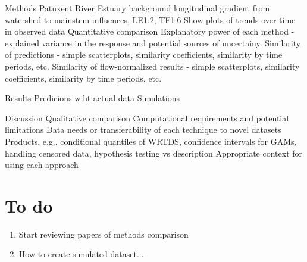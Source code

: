 \documentclass[letterpaper,12pt]{article}\usepackage[]{graphicx}\usepackage[]{color}
\begin{document}
\begin{outline}
\0 Methods
\1 Patuxent River Estuary background
\2 longitudinal gradient from watershed to mainstem influences, LE1.2, TF1.6
\2 Show plots of trends over time in observed data
\1 Quantitative comparison
\2 Explanatory power of each method - explained variance in the response and potential sources of uncertainy.
\2 Similarity of predictions - simple scatterplots, similarity coefficients, similarity by time periods, etc.
\2 Similarity of flow-normalized results - simple scatterplots, similarity coefficients, similarity by time periods, etc.

\0 Results
\1 Predicions wiht actual data
\1 Simulations

\0 Discussion
\1 Qualitative comparison
\2 Computational requirements and potential limitations
\2 Data needs or transferability of each technique to novel datasets
\2 Products, e.g., conditional quantiles of \ac{WRTDS}, confidence intervals for \acp{GAM}, handling censored data, hypothesis testing vs description
\2 Appropriate context for using each approach

\end{outline}

\section{To do}
\begin{enumerate}
\item Start reviewing papers of methods comparison
\item How to create simulated dataset...
\end{enumerate}
\end{document}
